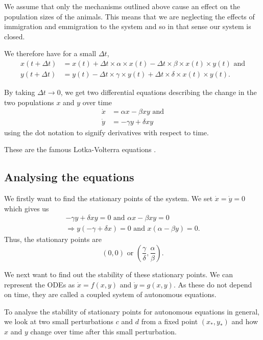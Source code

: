 \documentclass[12pt, a4paper]{article}
\begin{document}
We assume that only the mechanisms outlined above cause an effect on the population sizes of the animals. This means that we are neglecting the effects of immigration and emmigration to the system and so in that sense our system is closed.

We therefore have for a small $\Delta t$,
\begin{align}
x(t + \Delta t) &= x(t) + \Delta t \times \alpha \times x(t) - \Delta t \times \beta \times x(t) \times y(t) \text{ and} \\
y(t + \Delta t) &= y(t) - \Delta t \times \gamma \times y(t) + \Delta t \times \delta \times x(t) \times y(t).
\end{align}

By taking $\Delta t \rightarrow 0$, we get two differential equations describing the change in the two populations $x$ and $y$ over time
\begin{align}
\dot{x} &= \alpha x - \beta x y \text{ and} \\
\dot{y} &= - \gamma y + \delta x y
\end{align}
using the dot notation to signify derivatives with respect to time.

These are the famous Lotka-Volterra equations \cite{JeffChasLV}.

\subsection{Analysing the equations}
We firstly want to find the stationary points of the system. We set $\dot{x} = \dot{y} = 0$ which gives us
\begin{align}
- \gamma y + \delta x y = 0 \text{ and } \alpha x - \beta x y = 0 \\
\Rightarrow y(-\gamma + \delta x) = 0 \text{ and } x(\alpha - \beta y) = 0.
\end{align}
Thus, the stationary points are
\begin{equation}
(0,0) \text{ or } (\frac{\gamma}{\delta},\frac{\alpha}{\beta}).
\end{equation}

We next want to find out the stability of these stationary points. We can represent the ODEs as $\dot{x} = f(x, y)$ and $\dot{y} = g(x, y)$. As these do not depend on time, they are called a coupled system of autonomous equations.

To analyse the stability of stationary points for autonomous equations in general, we look at two small perturbations $c$ and $d$ from a fixed point $(x_*, y_*)$ and how $x$ and $y$ change over time after this small perturbation.
\end{document}
